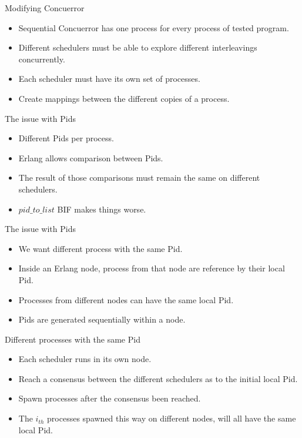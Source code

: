\documentclass[9pt]{beamer}
\begin{document}
\begin{frame} {Modifying Concuerror}

\begin{itemize}[<+->]
\item Sequential Concuerror has one process for every process of tested program.
\item Different schedulers must be able to explore different interleavings concurrently.
\item Each scheduler must have its own set of processes. 
\item Create mappings between the different copies of a process.
\end{itemize}

\end{frame}


\begin{frame} {The issue with Pids}


\begin{itemize}[<+->]
\item Different Pids per process.
\item Erlang allows comparison between Pids.
\item The result of those comparisons must remain the same on different schedulers. 
\item $pid\_to\_list$ BIF makes things worse.
\end{itemize}

\end{frame}

\begin{frame} {The issue with Pids}


\begin{itemize}[<+->]
\item We want different process with the same Pid.
\item Inside an Erlang node, process from that node are reference by their local Pid.
\item Processes from different nodes can have the same local Pid.
\item Pids are generated sequentially within a node.
\end{itemize}

\end{frame}

\begin{frame} {Different processes with the same Pid}


\begin{itemize}[<+->]
\item Each scheduler runs in its own node.
\item Reach a consensus between the different schedulers as to the initial local Pid.
\item Spawn processes after the consensus been reached.
\item The $i_{th}$ processes spawned this way on different nodes, will all have the same local Pid.
\end{itemize}

\end{frame}
\end{document}
